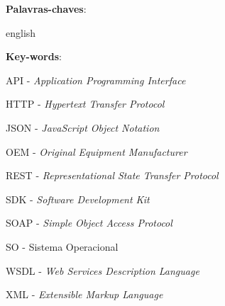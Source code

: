 
\setlength{\absparsep}{18pt} %
\begin{resumo}


    \textbf{Palavras-chaves}:

\end{resumo}

\begin{resumo}[Abstract]
    \begin{otherlanguage*}{english}

        \vspace{\onelineskip}

        \noindent
        \textbf{Key-words}:
    \end{otherlanguage*}
\end{resumo}


\listoffigures*



\begin{siglas}
    \item API - \textit{Application Programming Interface}
    \item HTTP - \textit{Hypertext Transfer Protocol}
    \item JSON - \textit{JavaScript Object Notation}
    \item OEM - \textit{Original Equipment Manufacturer}
    \item REST - \textit{Representational State Transfer Protocol}
    \item SDK - \textit{Software Development Kit}
    \item  SOAP - \textit{Simple Object Access Protocol}
    \item SO - Sistema Operacional
    \item WSDL - \textit{Web Services Description Language}
    \item XML - \textit{Extensible Markup Language}


\end{siglas}


\tableofcontents*
\cleardoublepage

